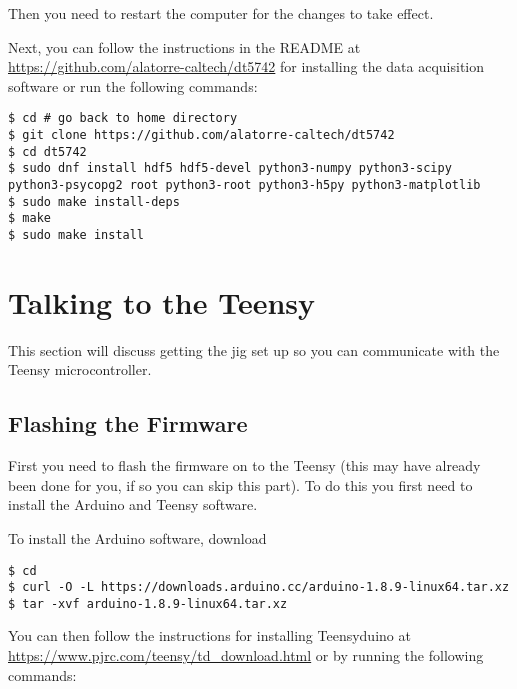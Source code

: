 \documentclass[12pt,openright,twoside]{report}
\begin{document}
Then you need to restart the computer for the changes to take effect.

Next, you can follow the instructions in the README at
\url{https://github.com/alatorre-caltech/dt5742} for installing the data
acquisition software or run the following commands:

\begin{mdframed}[backgroundcolor=light-gray, roundcorner=10pt,leftmargin=1, rightmargin=1, innerleftmargin=15, innertopmargin=15,innerbottommargin=15, outerlinewidth=1, linecolor=light-gray,roundcorner=20pt]
\begin{lstlisting}
$ cd # go back to home directory
$ git clone https://github.com/alatorre-caltech/dt5742
$ cd dt5742
$ sudo dnf install hdf5 hdf5-devel python3-numpy python3-scipy python3-psycopg2 root python3-root python3-h5py python3-matplotlib
$ sudo make install-deps
$ make
$ sudo make install
\end{lstlisting}
\end{mdframed}

\section{Talking to the Teensy}
This section will discuss getting the jig set up so you can communicate with the Teensy microcontroller.
\subsection{Flashing the Firmware}
First you need to flash the firmware on to the Teensy (this may have already
been done for you, if so you can skip this part). To do this you first need to install the Arduino and Teensy software.

To install the Arduino software, download

\begin{mdframed}[backgroundcolor=light-gray, roundcorner=10pt,leftmargin=1, rightmargin=1, innerleftmargin=15, innertopmargin=15,innerbottommargin=15, outerlinewidth=1, linecolor=light-gray]
\begin{lstlisting}
$ cd
$ curl -O -L https://downloads.arduino.cc/arduino-1.8.9-linux64.tar.xz
$ tar -xvf arduino-1.8.9-linux64.tar.xz
\end{lstlisting}
\end{mdframed}

You can then follow the instructions for installing Teensyduino at \url{https://www.pjrc.com/teensy/td_download.html} or by running the following commands:
\end{document}
